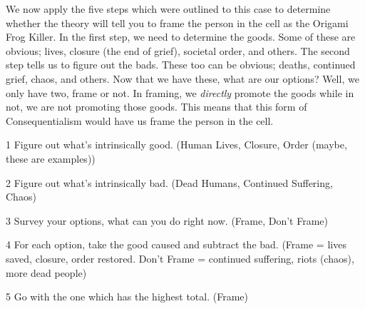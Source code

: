 
We now apply the five steps which were outlined to this case to determine whether the theory will tell you to frame the person in the cell as the Origami Frog Killer. In the first step, we need to determine the goods. Some of these are obvious; lives, closure (the end of grief), societal order, and others. The second step tells us to figure out the bads. These too can be obvious; deaths, continued grief, chaos, and others. Now that we have these, what are our options? Well, we only have two, frame or not. In framing, we \emph{directly} promote the goods while in not, we are not promoting those goods. This means that this form of Consequentialism would have us frame the person in the cell. 

\begin{earg}
    \item[1] Figure out what’s intrinsically good. (Human Lives, Closure, Order (maybe, these are examples))
    \item[2] Figure out what’s intrinsically bad. (Dead Humans, Continued Suffering, Chaos)
    \item[3] Survey your options, what can you do right now. (Frame, Don’t Frame)
    \item[4] For each option, take the good caused and subtract the bad. (Frame = lives saved, closure, order restored. Don’t Frame = continued suffering, riots (chaos), more dead people)
    \item[5] Go with the one which has the highest total. (Frame)
\end{earg}

